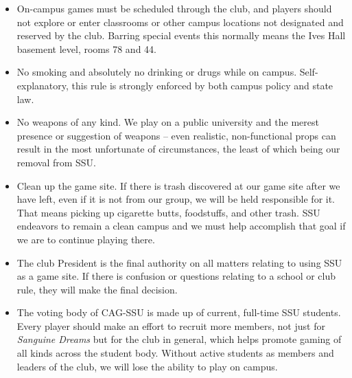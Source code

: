 \begin{itemize}
	\item On-campus games must be scheduled through the club, and players should not explore or enter 
	classrooms or other campus locations not designated and reserved by the club.  Barring special events 
	this normally means the Ives Hall basement level, rooms 78 and 44.
	\item No smoking and absolutely no drinking or drugs while on campus.  Self-explanatory, this rule is 
	strongly enforced by both campus policy and state law.
	\item No weapons of any kind.  We play on a public university and the merest presence or suggestion of 
	weapons -- even realistic, non-functional props can result in the most unfortunate of circumstances, the 
	least of which 	being our removal from SSU.
	\item Clean up the game site.  If there is trash discovered at our game site after we have left, even if 
	it is not from our group, we will be held responsible for it.  That means picking up cigarette butts, 
	foodstuffs, and other trash.  SSU endeavors to remain a clean campus and we must help accomplish that goal 
	if we are to continue playing there.
	\item The club President is the final authority on all matters relating to using SSU as a game site.  If 
	there is confusion or questions relating to a school or club rule, they will make the final decision.
	\item The voting body of CAG-SSU is made up of current, full-time SSU students.  Every player should make 
	an effort to recruit more members, not just for \emph{Sanguine Dreams} but for the club in general, 
	which helps promote gaming of all kinds across the student body.  Without active students as members and 
	leaders of the club, we will lose the ability to play on campus.
\end{itemize}